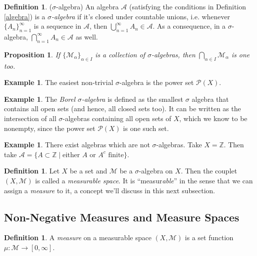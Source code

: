\documentclass[12pt]{article}
\theoremstyle{plain}
\newtheorem{prop}[thm]{Proposition}
\theoremstyle{definition}
\newtheorem{defn}[thm]{Definition}
\newtheorem{ex}[thm]{Example}
\theoremstyle{remark}
\begin{document}
\begin{defn} 
($\sigma$-algebra)
An algebra $\mathscr{A}$ (satisfying the conditions in Definition \ref{algebra}) is a \emph{$\sigma$-algebra} if it's closed under countable unions,  i.e. whenever $\{A_n\}^\infty_{n=1}$ is a sequence in $\mathscr{A}$, then $\bigcup^\infty_{n=1} A_n \in \mathscr{A}$. As a consequence, in a $\sigma$-algebra, $\bigcap^\infty_{n=1} A_n \in \mathscr{A}$ as well.
\end{defn}

\begin{prop}
If $\{\mathscr{M}_\alpha\}_{\alpha\in I}$ is a collection of $\sigma$-algebras, then $\bigcap_{\alpha\in I} \mathscr{M}_\alpha$ is one too.
\end{prop}

\begin{ex}
The easiest non-trivial $\sigma$-algebra is the power set $\mathscr{P}(X)$.
\end{ex}

\begin{ex}
The \emph{Borel $\sigma$-algebra} is defined as the smallest $\sigma$ algebra that contains all open sets (and hence, all closed sets too). It can be written as the intersection of all $\sigma$-algebras containing all open sets of $X$, which we know to be nonempty, since the power set $\mathscr{P}(X)$ is one such set.
\end{ex}

\begin{ex}
There exist algebras which are not $\sigma$-algebras. Take $X=\mathbb{Z}$. Then take $\mathscr{A} = \{A\subset \mathbb{Z} \; |\; \text{either $A$ or $A^c$ finite}\}$. 
\end{ex}

\begin{defn} 
    Let $X$ be a set and $\mathscr{M}$ be a $\sigma$-algebra on $X$. Then the couplet $(X, \mathscr{M})$ is called a \emph{measurable space}. It is ``measur\emph{able}'' in the sense that we can assign a \emph{measure} to it, a concept we'll discuss in this next subsection.
\end{defn}



\subsection{Non-Negative Measures and Measure Spaces}

\begin{defn} 
A \emph{measure} on a measurable space $(X,\mathscr{M})$ is a set function $\mu: \mathscr{M} \rightarrow [0,\infty]$.
\end{defn}
\end{document}
